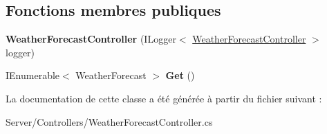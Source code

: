 \subsection*{Fonctions membres publiques}
\begin{DoxyCompactItemize}
\item 
\mbox{\label{class_mediwatch_website_1_1_server_1_1_controllers_1_1_weather_forecast_controller_a1692c7a64dc181890c1e2215e8f70d97}} 
{\bfseries Weather\+Forecast\+Controller} (I\+Logger$<$ \hyperlink{class_mediwatch_website_1_1_server_1_1_controllers_1_1_weather_forecast_controller}{Weather\+Forecast\+Controller} $>$ logger)
\item 
\mbox{\label{class_mediwatch_website_1_1_server_1_1_controllers_1_1_weather_forecast_controller_a6a1d7d76fd55ecfad8f1bab04e5fa50b}} 
I\+Enumerable$<$ Weather\+Forecast $>$ {\bfseries Get} ()
\end{DoxyCompactItemize}


La documentation de cette classe a été générée à partir du fichier suivant \+:\begin{DoxyCompactItemize}
\item 
Server/\+Controllers/Weather\+Forecast\+Controller.\+cs\end{DoxyCompactItemize}
